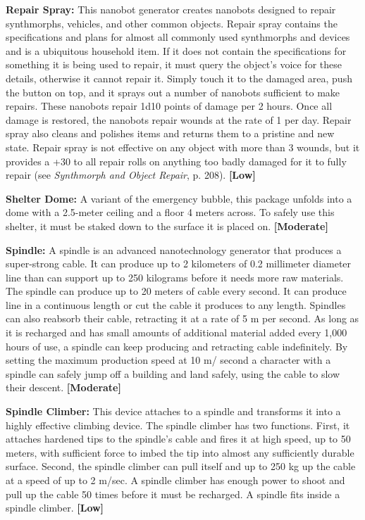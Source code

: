 \textbf{Repair Spray:} This nanobot generator creates nanobots designed to repair synthmorphs, vehicles, and other common objects. Repair spray contains the specifications and plans for almost all commonly used synthmorphs and devices and is a ubiquitous household item. If it does not contain the specifications for something it is being used to repair, it must query the object’s voice for these details, otherwise it cannot repair it. Simply touch it to the damaged area, push the button on top, and it sprays out a number of nanobots sufficient to make repairs. These nanobots repair 1d10 points of damage per 2 hours. Once all damage is restored, the nanobots repair wounds at the rate of 1 per day. Repair spray also cleans and polishes items and returns them to a pristine and new state. Repair spray is not effective on any object with more than 3 wounds, but it provides a +30 to all repair rolls on anything too badly damaged for it to fully repair (see \emph{Synthmorph and Object Repair}, p. 208). \textbf{[Low]}

\textbf{Shelter Dome:} A variant of the emergency bubble, this package unfolds into a dome with a 2.5-meter ceiling and a floor 4 meters across. To safely use this shelter, it must be staked down to the surface it is placed on. \textbf{[Moderate]}

\textbf{Spindle:} A spindle is an advanced nanotechnology generator that produces a super-strong cable. It can produce up to 2 kilometers of 0.2 millimeter diameter line than can support up to 250 kilograms before it needs more raw materials. The spindle can produce up to 20 meters of cable every second. It can produce line in a continuous length or cut the cable it produces to any length. Spindles can also reabsorb their cable, retracting it at a rate of 5 m per second. As long as it is recharged and has small amounts of additional material added every 1,000 hours of use, a spindle can keep producing and retracting cable indefinitely. By setting the maximum production speed at 10 m/ second a character with a spindle can safely jump off a building and land safely, using the cable to slow their descent. \textbf{[Moderate]}

\textbf{Spindle Climber:} This device attaches to a spindle and transforms it into a highly effective climbing device. The spindle climber has two functions. First, it attaches hardened tips to the spindle’s cable and fires it at high speed, up to 50 meters, with sufficient force to imbed the tip into almost any sufficiently durable surface. Second, the spindle climber can pull itself and up to 250 kg up the cable at a speed of up to 2 m/sec. A spindle climber has enough power to shoot and pull up the cable 50 times before it must be recharged. A spindle fits inside a spindle climber. \textbf{[Low]}

